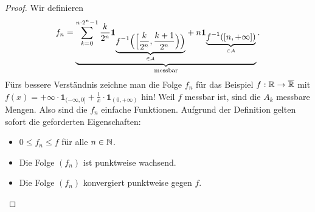 \begin{proof}
	Wir definieren \[ f_n = \underbrace{\sum\limits_{k=0}^{n\cdot 2^n-1} \frac{k}{2^n} \mathbf{1}_{\underbrace{f^{-1} \Big(\Big[\frac{k}{2^n}, \frac{k + 1}{2^n}\Big)\Big)}_{\in \mathcal{A}}} + n \mathbf{1}_{\underbrace{f^{-1}([n,+\infty])}_{\in \mathcal{A}}}}_{\text{messbar}}. \]
	F\"urs bessere Verst\"andnis zeichne man die Folge $f_n$ f\"ur das Beispiel $f:\mathbb{R}\to\overline {\mathbb{R}}$ mit $f(x)=+\infty\cdot \textbf{1}_{(-\infty,0]}+\frac{1}{x}\cdot\mathbf{1}_{(0,+\infty)}$ hin! Weil $f$ messbar ist, sind die $A_k$ messbare Mengen. Also sind die $f_n$ einfache Funktionen. Aufgrund der Definition gelten sofort die geforderten Eigenschaften:
	\begin{itemize}
		\item $0\leq f_n \leq f$ f\"ur alle $n\in\mathbb{N}$.
		\item Die Folge $(f_n)$ ist punktweise wachsend.
		\item Die Folge $(f_n)$ konvergiert punktweise gegen $f$.
	\end{itemize}
\end{proof}

